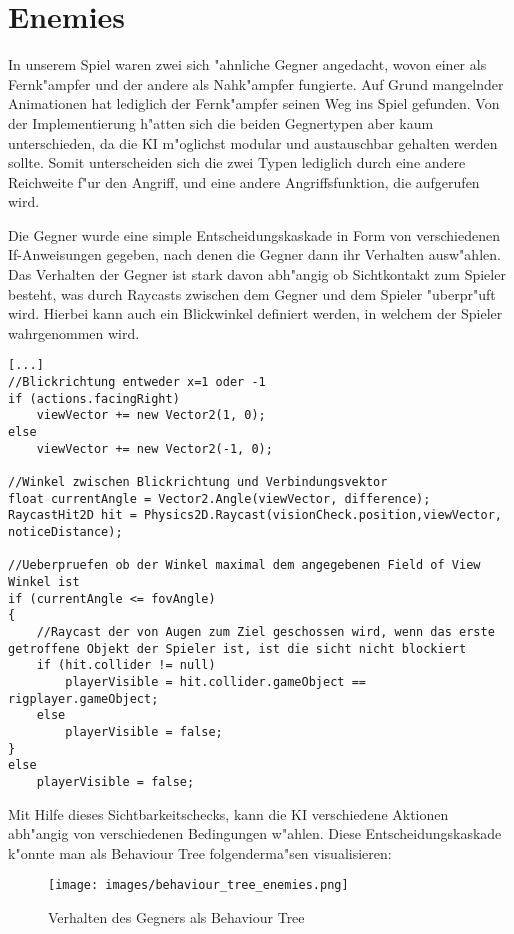 \chapter{Enemies}
In unserem Spiel waren zwei sich "ahnliche Gegner angedacht, wovon einer als Fernk"ampfer und der andere als Nahk"ampfer fungierte. Auf Grund mangelnder Animationen hat lediglich der Fernk"ampfer seinen Weg ins Spiel gefunden. Von der Implementierung h"atten sich die beiden Gegnertypen aber kaum unterschieden, da die KI m"oglichst modular und austauschbar gehalten werden sollte. Somit unterscheiden sich die zwei Typen lediglich durch eine andere Reichweite f"ur den Angriff, und eine andere Angriffsfunktion, die aufgerufen wird.\newline

Die Gegner wurde eine simple Entscheidungskaskade in Form von verschiedenen If-Anweisungen gegeben, nach denen die Gegner dann ihr Verhalten ausw"ahlen. Das Verhalten der Gegner ist stark davon abh"angig ob Sichtkontakt zum Spieler besteht, was durch Raycasts zwischen dem Gegner und dem Spieler "uberpr"uft wird.  Hierbei kann auch ein Blickwinkel definiert werden, in welchem der Spieler wahrgenommen wird.

\begin{lstlisting}[breaklines=true]
[...]
//Blickrichtung entweder x=1 oder -1
if (actions.facingRight)
    viewVector += new Vector2(1, 0);
else
    viewVector += new Vector2(-1, 0);

//Winkel zwischen Blickrichtung und Verbindungsvektor
float currentAngle = Vector2.Angle(viewVector, difference);
RaycastHit2D hit = Physics2D.Raycast(visionCheck.position,viewVector, noticeDistance);

//Ueberpruefen ob der Winkel maximal dem angegebenen Field of View Winkel ist
if (currentAngle <= fovAngle)
{
    //Raycast der von Augen zum Ziel geschossen wird, wenn das erste getroffene Objekt der Spieler ist, ist die sicht nicht blockiert
    if (hit.collider != null)
        playerVisible = hit.collider.gameObject == rigplayer.gameObject;
	else
		playerVisible = false;
}
else
	playerVisible = false;

\end{lstlisting}

Mit Hilfe dieses Sichtbarkeitschecks, kann die KI verschiedene Aktionen abh"angig von verschiedenen Bedingungen w"ahlen.
Diese Entscheidungskaskade k"onnte man als Behaviour Tree folgenderma"sen visualisieren:

\begin{figure}
	\centering
	\texttt{[image: images/behaviour\_tree\_enemies.png]}
	\caption{Verhalten des Gegners als Behaviour Tree}
	\label{fig:behaviour_tree_enemy}
\end{figure}


